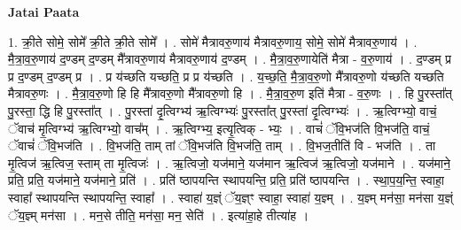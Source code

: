 \documentclass[17pt]{extarticle}
\begin{document}
\textbf{Jatai Paata} \newline

1. क्री॒ते सोमे॒ सोमे᳚ क्री॒ते क्री॒ते सोमे᳚ । . सोमे॑ मैत्रावरु॒णाय॑ मैत्रावरु॒णाय॒ सोमे॒ सोमे॑ मैत्रावरु॒णाय॑ । . मै॒त्रा॒व॒रु॒णाय॑ द॒ण्डम् द॒ण्डम् मै᳚त्रावरु॒णाय॑ मैत्रावरु॒णाय॑ द॒ण्डम् । . मै॒त्रा॒व॒रु॒णायेति॑ मैत्रा - व॒रु॒णाय॑ । . द॒ण्डम् प्र प्र द॒ण्डम् द॒ण्डम् प्र । . प्र य॑च्छति यच्छति॒ प्र प्र य॑च्छति । . य॒च्छ॒ति॒ मै॒त्रा॒व॒रु॒णो मै᳚त्रावरु॒णो य॑च्छति यच्छति मैत्रावरु॒णः । . मै॒त्रा॒व॒रु॒णो हि हि मै᳚त्रावरु॒णो मै᳚त्रावरु॒णो हि । . मै॒त्रा॒व॒रु॒ण इति॑ मैत्रा - व॒रु॒णः । . हि पु॒रस्ता᳚त् पु॒रस्ता॒ द्धि हि पु॒रस्ता᳚त् । . पु॒रस्ता॑ दृ॒त्विग्भ्य॑ ऋ॒त्विग्भ्यः॑ पु॒रस्ता᳚त् पु॒रस्ता॑ दृ॒त्विग्भ्यः॑ । . ऋ॒त्विग्भ्यो॒ वाचं॒ ॅवाच॑ मृ॒त्विग्भ्य॑ ऋ॒त्विग्भ्यो॒ वाच᳚म् । . ऋ॒त्विग्भ्य॒ इत्यृ॒त्विक् - भ्यः॒ । . वाचं॑ ॅवि॒भज॑ति वि॒भज॑ति॒ वाचं॒ ॅवाचं॑ ॅवि॒भज॑ति । . वि॒भज॑ति॒ ताम् तां ॅवि॒भज॑ति वि॒भज॑ति॒ ताम् । . वि॒भज॒तीति॑ वि - भज॑ति । . ता मृ॒त्विज॑ ऋ॒त्विज॒ स्ताम् ता मृ॒त्विजः॑ । . ऋ॒त्विजो॒ यज॑माने॒ यज॑मान ऋ॒त्विज॑ ऋ॒त्विजो॒ यज॑माने । . यज॑माने॒ प्रति॒ प्रति॒ यज॑माने॒ यज॑माने॒ प्रति॑ । . प्रति॑ ष्ठापयन्ति स्थापयन्ति॒ प्रति॒ प्रति॑ ष्ठापयन्ति । . स्था॒प॒य॒न्ति॒ स्वाहा॒ स्वाहा᳚ स्थापयन्ति स्थापयन्ति॒ स्वाहा᳚ । . स्वाहा॑ य॒ज्ञ्ं ॅय॒ज्ञ्ꣳ स्वाहा॒ स्वाहा॑ य॒ज्ञ्म् । . य॒ज्ञ्म् मन॑सा॒ मन॑सा य॒ज्ञ्ं ॅय॒ज्ञ्म् मन॑सा । . मन॒से तीति॒ मन॑सा॒ मन॒ सेति॑ । . इत्या॑हा॒हे तीत्या॑ह । \newline
\end{document}
